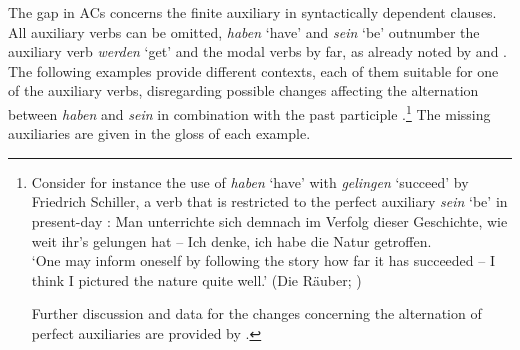 \documentclass[output=paper,colorlinks,citecolor=brown]{langscibook}
\begin{document}
\largerpage
The gap in ACs concerns the finite auxiliary in syntactically dependent clauses. All auxiliary verbs can be omitted, \textit{haben} `have' and \textit{sein} `be' outnumber the auxiliary verb \textit{werden} `get' and the modal verbs by far, as already noted by \textcite{breitbarth2005} and \textcite{blum2018}. The following examples provide different contexts, each of them suitable for one of the auxiliary verbs, disregarding possible changes affecting the alternation between \textit{haben} and \textit{sein} in combination with the past participle \citep[387]{ERSW93,sapp2011a}.\footnote{Consider for instance the use of \textit{haben} `have' with \textit{gelingen} `succeed' by Friedrich Schiller, a verb that is restricted to the perfect auxiliary \textit{sein} `be' in present-day : 
\ea
Man unterrichte sich demnach im Verfolg dieser Geschichte, wie weit ihr's gelungen hat -- Ich denke, ich habe die Natur getroffen.  \\ `One may inform oneself by following the story how far it has succeeded -- I think I pictured the nature quite well.' \hfill (Die Räuber; \citet[275]{behaghel23})
\z

\noindent
Further discussion and data for the changes concerning the alternation of perfect auxiliaries are provided by \citet[273ff.]{behaghel23}.
} The missing auxiliaries are given in the gloss of each example.  
\end{document}
